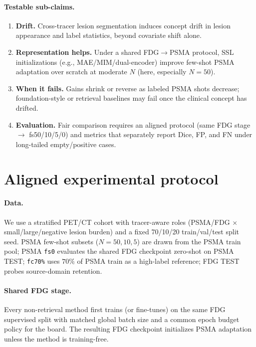 \documentclass{article} %
\begin{document}
\paragraph{Testable sub-claims.}
\begin{enumerate}
    \item \textbf{Drift.} Cross-tracer lesion segmentation induces concept drift in
    lesion appearance and label statistics, beyond covariate shift alone.
    \item \textbf{Representation helps.} Under a shared FDG$\rightarrow$PSMA protocol,
    SSL initializations (e.g., MAE/MIM/dual-encoder) improve few-shot PSMA adaptation
    over scratch at moderate $N$ (here, especially $N{=}50$).
    \item \textbf{When it fails.} Gains shrink or reverse as labeled PSMA shots
    decrease; foundation-style or retrieval baselines may fail once the clinical
    concept has drifted.
    \item \textbf{Evaluation.} Fair comparison requires an aligned protocol
    (same FDG stage $\rightarrow$ fs50/10/5/0) and metrics that separately report
    Dice, FP, and FN under long-tailed empty/positive cases.
\end{enumerate}

\section{Aligned experimental protocol}
\label{sec:protocol}

\paragraph{Data.}
We use a stratified PET/CT cohort with tracer-aware roles (PSMA/FDG $\times$
small/large/negative lesion burden) and a fixed 70/10/20 train/val/test split seed.
PSMA few-shot subsets ($N=50,10,5$) are drawn from the PSMA train pool; PSMA
\texttt{fs0} evaluates the shared FDG checkpoint zero-shot on PSMA TEST;
\texttt{fc70\%} uses $70\%$ of PSMA train as a high-label reference; FDG TEST
probes source-domain retention.

\paragraph{Shared FDG stage.}
Every non-retrieval method first trains (or fine-tunes) on the same FDG supervised
split with matched global batch size and a common epoch budget policy for the board.
The resulting FDG checkpoint initializes PSMA adaptation unless the method is
training-free.
\end{document}

